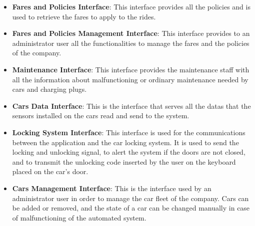 \begin{itemize}
  \item \textbf{Fares and Policies Interface}: This interface provides all the
                                               policies and is used to retrieve
                                               the fares to apply to the rides.
  \item \textbf{Fares and Policies Management Interface}: This interface
                                       provides to an administrator user all the
                                       functionalities to manage the fares and
                                       the policies of the company.
  \item \textbf{Maintenance Interface}: This interface provides the maintenance
                                        staff with all the information about
                                        malfunctioning or ordinary maintenance
                                        needed by cars and charging plugs.
  \item \textbf{Cars Data Interface}: This is the interface that serves all the
                                      datas that the sensors installed on the
                                      cars read and send to the system.
  \item \textbf{Locking System Interface}: This interface is used for the
                                           communications between the
                                           application and the car locking
                                           system. It is used to send the
                                           locking and unlocking signal, to
                                           alert the system if the doors are not
                                           closed, and to transmit the unlocking
                                           code inserted by the user on the
                                           keyboard placed on the car's door.
  \item \textbf{Cars Management Interface}: This is the interface used by an
                                            administrator user in order to
                                            manage the car fleet of the company.
                                            Cars can be added or removed, and
                                            the state of a car can be changed
                                            manually in case of malfunctioning
                                            of the automated system.


\end{itemize}
